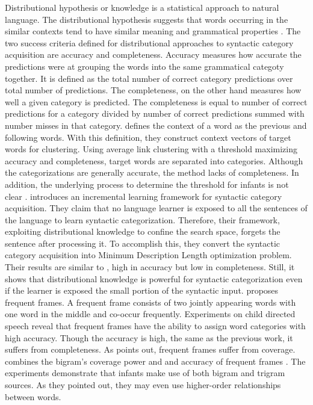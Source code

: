 Distributional hypothesis or knowledge is a statistical approach to natural
language. The distributional hypothesis suggests that words 
occurring in the similar contexts tend to have similar meaning 
and grammatical properties \cite{harris1954word}. The two success criteria defined for
distributional approaches to syntactic category
acquisition are accuracy and completeness. Accuracy measures how
accurate the predictions were at grouping the words into the
same grammatical categoty together. It is defined
as the total number of correct category predictions
over total number of predictions. The completeness, on the other hand
measures how well a given category is predicted. The completeness
is equal to number of correct predictions for a category divided
by number of correct predictions summed with number misses in that category.
\cite{Redington98distributionalinformation} defines the context of
a word as the previous and following words. With this definition, they construct
context vectors of target words for clustering. Using average link clustering
with a threshold maximizing accuracy and completeness, target  words are
separated into categories. Although the categorizations are generally accurate,
the method lacks of completeness. In addition, the underlying process to determine
the threshold for infants is not clear \cite{ambridge2011child}. \cite{cartwright1997syntactic} introduces an incremental learning framework for syntactic category acquisition. They claim that no language 
learner is exposed to all the sentences of the language to learn
syntactic categorization. Therefore, their framework, exploiting
distributional knowledge to confine the search space, forgets the sentence
after processing it. To accomplish this, they convert the syntactic category acquisition into 
Minimum Description Length optimization problem. Their results are 
similar to \cite{Redington98distributionalinformation}, high in 
accuracy but low in completeness. Still, it shows that distributional
knowledge is powerful for syntactic categorization even if the learner is
exposed the small portion of the syntactic input. \cite{Mintz200391} proposes frequent frames. A frequent frame consists of two jointly appearing words with one word in the middle and co-occur
frequently. Experiments on child directed speech reveal that 
frequent frames have the ability to assign word categories with high
accuracy. Though the accuracy is high, the same as the previous work, it suffers from
completeness. As \cite{clair2010} points out, frequent frames suffer from coverage.
\cite{clair2010} combines the bigram's 
coverage power \cite{Redington98distributionalinformation} and \cite{monaghan2008integration}
 and accuracy of frequent frames \cite{Mintz200391}. The 
experiments demonstrate that infants make use of both bigram and 
trigram sources. As they pointed out, they may even use higher-order 
relationships between words. 

